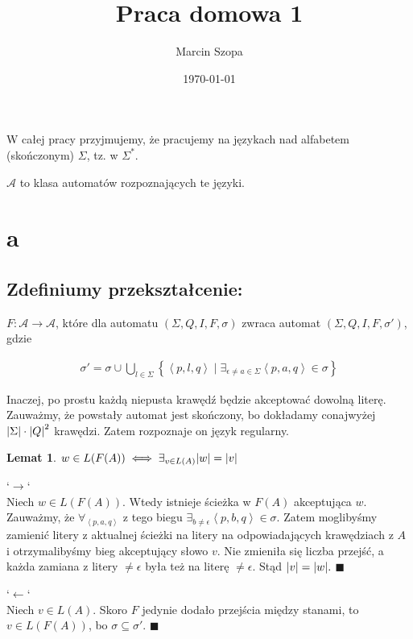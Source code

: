 \documentclass{article}
\title{Praca domowa 1}
\author{Marcin Szopa}
\date{\today}
\newtheorem{lemma}[theorem]{Lemat}
\theoremstyle{definition}
\theoremstyle{remark}
\begin{document}
\maketitle

W całej pracy przyjmujemy, że pracujemy na językach nad alfabetem (skończonym) \(\Sigma\), tz. w \( \Sigma^* \).

\(\mathcal{A}\) to klasa automatów rozpoznających te języki.

\section{a}

\subsection{Zdefiniumy przekształcenie:}


\(F: \mathcal{A} \to \mathcal{A}\), które dla automatu \(\left(\Sigma, Q, I, F, \sigma\right)\) zwraca automat \(\left(\Sigma, Q, I, F, \sigma'\right)\), gdzie

\begin{align*}
\sigma' = \sigma \cup \bigcup_{l \in \Sigma} \left\{ \left< p, l, q \right> \mid \exists_{\epsilon \neq a \in \Sigma}{\left< p, a, q \right> \in \sigma} \right\}
\end{align*}

Inaczej, po prostu każdą niepusta krawędź będzie akceptować dowolną literę. Zauważmy, że powstały automat jest skończony, bo dokładamy conajwyżej \(\abs{\Sigma} \cdot \abs{Q}^2\) krawędzi. Zatem rozpoznaje on język regularny.

\begin{lemma}
    \(w \in L(F(A)) \iff \exists_{v \in L(A)} \abs{w}=\abs{v}\)
\end{lemma}

`\(\rightarrow\)` \\
Niech \(w \in L(F(A))\). Wtedy istnieje ścieżka w \(F(A)\) akceptująca \(w\). Zauważmy, że \(\forall_{\left< p, a, q \right>}\) z tego biegu \( \exists_{b \neq \epsilon} \left< p, b, q \right> \in \sigma\). Zatem moglibyśmy zamienić litery z aktualnej ścieżki na litery na odpowiadających krawędziach z \(A\) i otrzymalibyśmy bieg akceptujący słowo \(v\). Nie zmieniła się liczba przejść, a każda zamiana z litery \(\neq \epsilon\) była też na literę \(\neq \epsilon\). Stąd \(\abs{v}=\abs{w}.\) \(\blacksquare\)

`\(\leftarrow\)` \\
Niech \(v \in L(A)\). Skoro \(F\) jedynie dodało przejścia między stanami, to \(v \in L(F(A))\), bo \(\sigma \subseteq \sigma'\). \(\blacksquare\)
\end{document}
